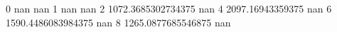 0 nan nan
1 nan nan
2 1072.3685302734375 nan
4 2097.16943359375 nan
6 1590.4486083984375 nan
8 1265.0877685546875 nan
